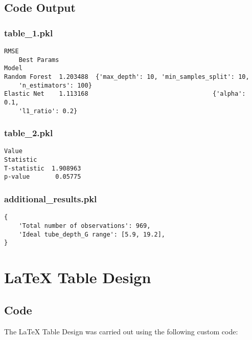 \documentclass[11pt]{article}
\begin{document}
\subsection{Code Output}

\subsubsection*{table\_1.pkl}

\begin{Verbatim}[tabsize=4]
                   RMSE
	Best Params
Model
Random Forest  1.203488  {'max_depth': 10, 'min_samples_split': 10,
	'n_estimators': 100}
Elastic Net    1.113168                                  {'alpha': 0.1,
	'l1_ratio': 0.2}
\end{Verbatim}

\subsubsection*{table\_2.pkl}

\begin{Verbatim}[tabsize=4]
                Value
Statistic
T-statistic  1.908963
p-value       0.05775
\end{Verbatim}

\subsubsection*{additional\_results.pkl}

\begin{Verbatim}[tabsize=4]
{
    'Total number of observations': 969,
    'Ideal tube_depth_G range': [5.9, 19.2],
}
\end{Verbatim}

\section{LaTeX Table Design}
\subsection{{Code}}
The LaTeX Table Design was carried out using the following custom code:
\end{document}
